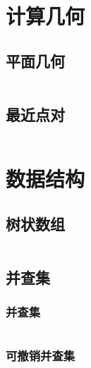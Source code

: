 \documentclass[a4paper, twoside]{article}
\begin{document}


\newpage
\section{计算几何}
\subsection{平面几何}
\inputminted{cpp}{../src/计算几何/平面几何.cpp}


\subsection{最近点对}
\inputminted{cpp}{../src/计算几何/最近点对.cpp}


\newpage
\section{数据结构}
\subsection{树状数组}
\inputminted{cpp}{../src/数据结构/树状数组.cpp}

\subsection{并查集}
    \subsubsection{并查集}
    \inputminted{cpp}{../src/数据结构/并查集.cpp}

    \subsubsection{可撤销并查集}
    \inputminted{cpp}{../src/数据结构/可撤销并查集.cpp}
\end{document}
